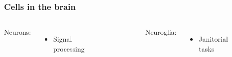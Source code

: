 \begin{frame}
 \frametitle{Cells in the brain}
 \begin{columns}
\column{2.0in} Neurons:\\
\begin{itemize}
 \item Signal processing
\end{itemize}
\begin{figure}[H]
 \centering
 \includegraphics[width=\textwidth]{figures/neuron.jpg}
\end{figure}

\column{2.0in} Neuroglia:\\
\begin{itemize}
 \item Janitorial tasks
\end{itemize}
\begin{figure}[H]
 \centering
 \includegraphics[width=\textwidth]{figures/neuroglia.jpg}
\end{figure}
 \end{columns}
\end{frame}
